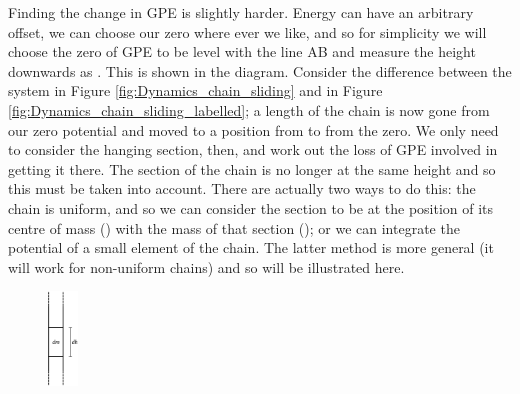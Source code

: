 \begin{problem}
{\begin{enumerate}
Finding the change in GPE is slightly harder. Energy can have an arbitrary offset, we can choose our zero where ever we like, and so for simplicity we will choose the zero of GPE to be level with the line AB and measure the height downwards as . This is shown in the diagram. Consider the difference between the system in Figure \ref{fig:Dynamics_chain_sliding} and in Figure \ref{fig:Dynamics_chain_sliding_labelled}; a length  of the chain is now gone from our zero potential and moved to a position from  to  from the zero. We only need to consider the hanging section, then, and work out the loss of GPE involved in getting it there. The section of the chain is no longer at the same height and so this must be taken into account. There are actually two ways to do this: the chain is uniform, and so we can consider the section to be at the position of its centre of mass () with the mass of that section (); or we can integrate the potential of a small element of the chain. The latter method is more general (it will work for non-uniform chains) and so will be illustrated here.

\begin{figure}[h]
\centering
\includegraphics[width=0.07\textwidth]{../../../figures/Dynamics_chain_element.svg}
\caption{}\label{fig:Dynamics_chain_element}
\end{figure}


\end{enumerate}}
\end{problem}

